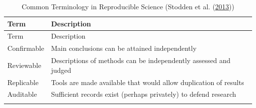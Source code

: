 \documentclass[11pt,preprint, authoryear]{elsarticle}
\numberwithin{equation}{section}
\numberwithin{figure}{section}
\numberwithin{table}{section}
\begin{document}
\begin{longtable}[]{@{}ll@{}}
\caption{Common Terminology in Reproducible Science (Stodden et al.
(\protect\hyperlink{ref-Stodden2013}{2013}))\label{Table1}}\tabularnewline
\toprule
\begin{minipage}[b]{0.18\columnwidth}\raggedright\strut
Term\strut
\end{minipage} & \begin{minipage}[b]{0.61\columnwidth}\raggedright\strut
Description\strut
\end{minipage}\tabularnewline
\midrule
\endfirsthead
\toprule
\begin{minipage}[b]{0.18\columnwidth}\raggedright\strut
Term\strut
\end{minipage} & \begin{minipage}[b]{0.61\columnwidth}\raggedright\strut
Description\strut
\end{minipage}\tabularnewline
\midrule
\endhead
\begin{minipage}[t]{0.18\columnwidth}\raggedright\strut
Confirmable\strut
\end{minipage} & \begin{minipage}[t]{0.61\columnwidth}\raggedright\strut
Main conclusions can be attained independently\strut
\end{minipage}\tabularnewline
\begin{minipage}[t]{0.18\columnwidth}\raggedright\strut
Reviewable\strut
\end{minipage} & \begin{minipage}[t]{0.61\columnwidth}\raggedright\strut
Descriptions of methods can be independently assessed and judged\strut
\end{minipage}\tabularnewline
\begin{minipage}[t]{0.18\columnwidth}\raggedright\strut
Replicable\strut
\end{minipage} & \begin{minipage}[t]{0.61\columnwidth}\raggedright\strut
Tools are made available that would allow duplication of results\strut
\end{minipage}\tabularnewline
\begin{minipage}[t]{0.18\columnwidth}\raggedright\strut
Auditable\strut
\end{minipage} & \begin{minipage}[t]{0.61\columnwidth}\raggedright\strut
Sufficient records exist (perhaps privately) to defend research\strut
\end{minipage}\tabularnewline
\begin{minipage}[t]{0.18\columnwidth}\raggedright\strut

\end{minipage}
\end{longtable}
\end{document}
